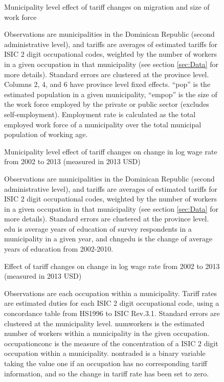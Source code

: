 \begin{landscape}
\begin{figure}[H]
\centering
Municipality level effect of tariff changes on migration and size of work force


\caption{\label{fig:Table3}}

\raggedright
\scriptsize
Observations are municipalities in the Dominican Republic (second administrative level),
and tariffs are averages of estimated tariffs for ISIC 2 digit occupational codes,
weighted by the number of workers in a given occupation in that municipality 
(see section \ref{sec:Data} for more details). Standard errors are clustered at the province level.
Columns 2, 4, and 6 have province level fixed effects.
``pop'' is the estimated population in a given municipality, ``empop'' is the size of
the work force employed by the private or public sector (excludes self-employment).
Employment rate is calculated as the total employed work force of a municipality
over the total municipal population of working age.
\end{figure}


\begin{figure}[H]
\centering
Municipality level effect of tariff changes on change in log wage rate from 2002 to 2013 (measured
in 2013 USD)

\caption{\label{fig:Table1}}
\raggedright
\scriptsize
Observations are municipalities in the Dominican Republic (second administrative level),
and tariffs are averages of estimated tariffs for ISIC 2 digit occupational codes,
weighted by the number of workers in a given occupation in that municipality 
(see section \ref{sec:Data} for more details). Standard errors are clustered at the province level.
edu is average years of education of survey respondents in a municipality in a given year,
and chngedu is the change of average years of education from 2002-2010.
\end{figure}

\begin{figure}[H]
\centering
Effect of tariff changes on change in log wage rate from 2002 to 2013 (measured in 2013 USD)

\caption{\label{fig:Table2}}
\raggedright
\scriptsize
Observations are each occupation within a municipality.
Tariff rates are estimated duties for each ISIC 2 digit occupational code,
using a concordance table from HS1996 to ISIC Rev.3.1. Standard errors are clustered at the 
municipality level. numworkers is the estimated
number of workers within a municipality in the given occupation. occupationconc is the measure of
the concentration of a ISIC 2 digit occupation within a municipality. nontraded is a binary variable
taking the value one if an occupation has no corresponding tariff information, and so the change in
tariff rate has been set to zero.
\end{figure}


\end{landscape}

